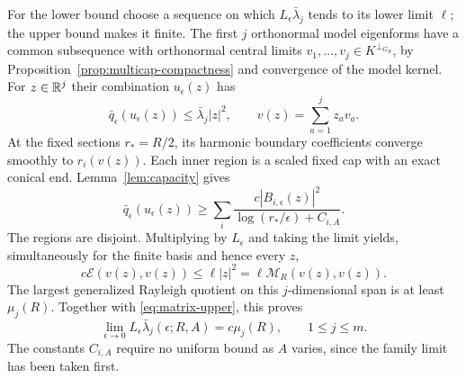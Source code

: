 For the lower bound choose a sequence on which
$L_\epsilon\bar\lambda_j$ tends to its lower limit $\ell$; the upper
bound makes it finite. The first $j$ orthonormal model eigenforms have a
common subsequence with orthonormal central limits
$v_1,\ldots,v_j\in K^{\perp_{G_R}}$, by
Proposition~\ref{prop:multicap-compactness} and convergence of the model
kernel. For $z\in\mathbb R^j$ their combination $u_\epsilon(z)$ has
\[
 \bar q_\epsilon(u_\epsilon(z))\le\bar\lambda_j|z|^2,
 \qquad v(z)=\sum_{a=1}^jz_av_a.
\]
At the fixed sections $r_*=R/2$, its harmonic boundary coefficients
converge smoothly to $r_i(v(z))$. Each inner region is a scaled fixed
cap with an exact conical end. Lemma~\ref{lem:capacity} gives
\[
 \bar q_\epsilon(u_\epsilon(z))\ge
 \sum_i\frac{c|B_{i,\epsilon}(z)|^2}
                    {\log(r_*/\epsilon)+C_{i,A}}.
\]
The regions are disjoint. Multiplying by $L_\epsilon$ and taking the
limit yields, simultaneously for the finite basis and hence every $z$,
\[
 c\mathcal E(v(z),v(z))\le\ell|z|^2=\ell \mathcal M_R(v(z),v(z)).
\]
The largest generalized Rayleigh quotient on this $j$-dimensional span is
at least $\mu_j(R)$. Together with \eqref{eq:matrix-upper}, this proves
\begin{equation}\label{eq:matrix-model-law}
 \lim_{\epsilon\to0}L_\epsilon\bar\lambda_j(\epsilon;R,A)
       =c\mu_j(R),\qquad 1\le j\le m.
\end{equation}
The constants $C_{i,A}$ require no uniform bound as $A$ varies, since the
family limit has been taken first.

